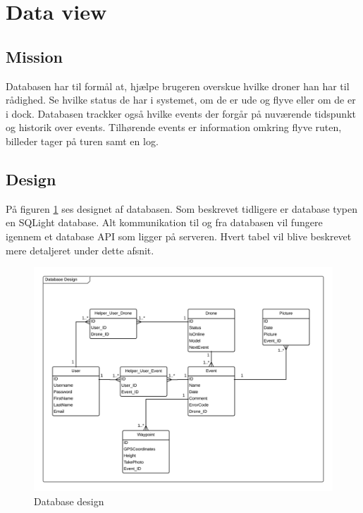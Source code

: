 \section{Data view}

\subsection{Mission}
Databasen har til formål at, hjælpe brugeren overskue hvilke droner han har til rådighed. Se hvilke status de har i systemet, om de er ude og flyve eller om de er i dock. Databasen trackker også hvilke events der forgår på nuværende tidspunkt og historik over events. Tilhørende events er information omkring flyve ruten, billeder tager på turen samt en log.

\subsection{Design}
På figuren \ref{fig:database_design} ses designet af databasen. Som beskrevet tidligere er database typen en SQLight database. Alt kommunikation til og fra databasen vil fungere igennem et database API som ligger på serveren. Hvert tabel vil blive beskrevet mere detaljeret under dette afsnit.

\vspace{-5pt}
\begin{figure}[H]
	\centering
	\includegraphics[width=1\textwidth]{Billeder/database/database_design.png}
	\vspace{-5pt}
	\caption{Database design}
	\label{fig:database_design}
\end{figure}

